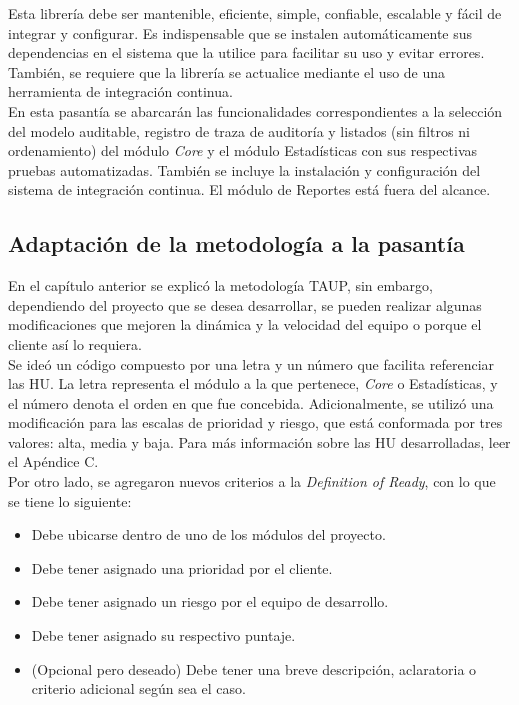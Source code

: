 Esta librería debe ser mantenible, eficiente, simple, confiable, escalable y fácil de integrar y configurar. Es indispensable que se instalen automáticamente sus dependencias en el sistema que la utilice para facilitar su uso y evitar errores. También, se requiere que la librería se actualice mediante el uso de una herramienta de integración continua.\\

En esta pasantía se abarcarán las funcionalidades correspondientes a la selección del modelo auditable, registro de traza de auditoría y listados (sin filtros ni ordenamiento) del módulo \textit{Core} y el módulo Estadísticas con sus respectivas pruebas automatizadas. También se incluye la instalación y configuración del sistema de integración continua. El módulo de Reportes está fuera del alcance.

\subsection{Adaptación de la metodología a la pasantía}

En el capítulo anterior se explicó la metodología TAUP, sin embargo, dependiendo del proyecto que se desea desarrollar, se pueden realizar algunas modificaciones que mejoren la dinámica y la velocidad del equipo o porque el cliente así lo requiera.\\

Se ideó un código compuesto por una letra y un número que facilita referenciar las HU. La letra representa el módulo a la que pertenece, \textit{Core} o Estadísticas, y el número denota el orden en que fue concebida. Adicionalmente, se utilizó una modificación  para las escalas de prioridad y riesgo, que está conformada por tres valores: alta, media y baja. Para más información sobre las HU desarrolladas, leer el Apéndice C.\\

Por otro lado, se agregaron nuevos criterios a la \textit{Definition of Ready}, con lo que se tiene lo siguiente:

\begin{itemize}
    \item Debe ubicarse dentro de uno de los módulos del proyecto.
    \item Debe tener asignado una prioridad por el cliente.
    \item Debe tener asignado un riesgo por el equipo de desarrollo.
    \item Debe tener asignado su respectivo puntaje.
    \item (Opcional pero deseado) Debe tener una breve descripción, aclaratoria o criterio adicional según sea el caso.
\end{itemize}

